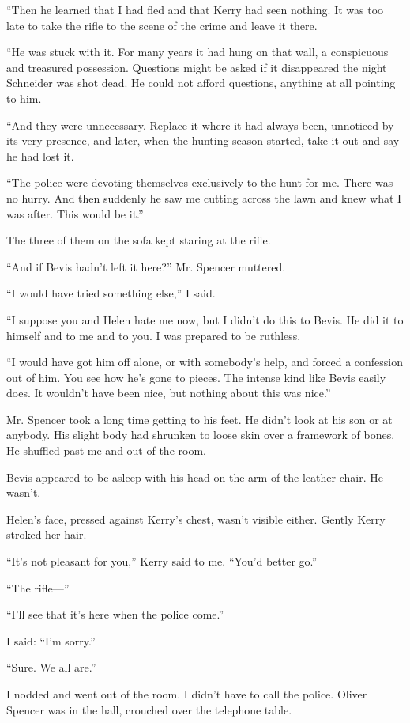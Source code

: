 \documentclass{novel}
\begin{document}
“Then he learned that I had fled and that Kerry had seen nothing. It was too late to take the rifle to the scene of the crime and leave it there. 

“He was stuck with it. For many years it had hung on that wall, a conspicuous and treasured possession. Questions might be asked if it disappeared the night Schneider was shot dead. He could not afford questions, anything at all pointing to him. 

“And they were unnecessary. Replace it where it had always been, unnoticed by its very presence, and later, when the hunting season started, take it out and say he had lost it. 

“The police were devoting themselves exclusively to the hunt for me. There was no hurry. And then suddenly he saw me cutting across the lawn and knew what I was after. This would be it.”

\scenestars

The three of them on the sofa kept staring at the rifle.

“And if Bevis hadn’t left it here?” Mr. Spencer muttered.

“I would have tried something else,” I said. 

“I suppose you and Helen hate me now, but I didn’t do this to Bevis. He did it to himself and to me and to you. I was prepared to be ruthless. 

“I would have got him off alone, or with somebody’s help, and forced a confession out of him. You see how he’s gone to pieces. The intense kind like Bevis easily does. It wouldn’t have been nice, but nothing about this was nice.”

Mr. Spencer took a long time getting to his feet. He didn’t look at his son or at anybody. His slight body had shrunken to loose skin over a framework of bones. He shuffled past me and out of the room.

Bevis appeared to be asleep with his head on the arm of the leather chair. He wasn’t.

Helen’s face, pressed against Kerry’s chest, wasn’t visible either. Gently Kerry stroked her hair.

“It’s not pleasant for you,” Kerry said to me. “You’d better go.”

“The rifle—”

“I’ll see that it’s here when the police come.”

I said: “I’m sorry.”

“Sure. We all are.”

I nodded and went out of the room. I didn’t have to call the police. Oliver Spencer was in the hall, crouched over the telephone table.
\end{document}
